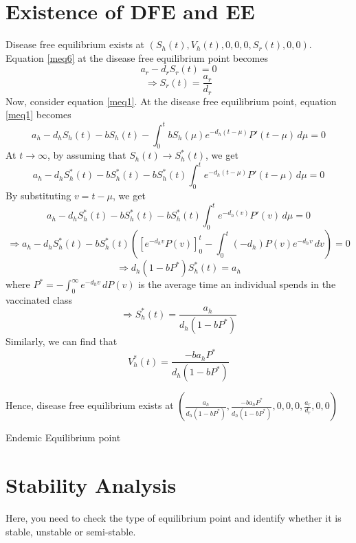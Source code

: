 \section{Existence of DFE and EE}
Disease free equilibrium exists at $(S_{h}(t), V_{h}(t), 0, 0, 0, S_{r}(t), 0, 0)$. Equation \ref{meq6} at the disease free equilibrium point becomes
\[a_{r}-d_{r}S_{r}(t) = 0\]
\[\Rightarrow S_{r}(t) = \frac{a_{r}}{d_{r}}\]
Now, consider equation \ref{meq1}. At the disease free equilibrium point, equation \ref{meq1} becomes
\[a_{h}-d_{h}S_{h}(t)-bS_{h}(t)-\int_{0}^{t} bS_{h}(\mu)e^{-d_{h}(t-\mu)}P'(t-\mu) \,d\mu = 0\]
At $t \rightarrow \infty$, by assuming that $S_{h}(t) \rightarrow S^{*}_{h}(t)$, we get
\[a_{h}-d_{h}S^{*}_{h}(t)-bS^{*}_{h}(t)-bS^{*}_{h}(t)\int_{0}^{t}e^{-d_{h}(t-\mu)}P'(t-\mu) \,d\mu = 0\]
By substituting $v = t-\mu$, we get
\[a_{h}-d_{h}S^{*}_{h}(t)-bS^{*}_{h}(t)-bS^{*}_{h}(t)\int_{0}^{t}e^{-d_{h}(v)}P'(v) \,d\mu = 0\]
\[\Rightarrow a_{h}-d_{h}S^{*}_{h}(t)-bS^{*}_{h}(t)\left(\left[e^{-d_{h}v}P(v)\right]^{t}_{0}-\int_{0}^{t}(-d_{h})P(v)e^{-d_{h}v} \,dv\right) = 0\]
\[\Rightarrow d_{h}(1-bP^{*})S^{*}_{h}(t) = a_{h}\]
where $P^{*} = -\int_{0}^{\infty}e^{-d_{h}v} \,dP(v) $ is the average time an individual spends in the vaccinated class
\[\Rightarrow S^{*}_{h}(t) = \frac{a_{h}}{d_{h}(1-bP^{*})}\]
Similarly, we can find that
\[V^{*}_{h}(t) = \frac{-ba_{h}P^{*}}{d_{h}(1-bP^{*})}\]

Hence, disease free equilibrium exists at $\left(\frac{a_{h}}{d_{h}(1-bP^{*})},\frac{-ba_{h}P^{*}}{d_{h}(1-bP^{*})},0,0,0,\frac{a_{r}}{d_{r}},0,0\right)$

Endemic Equilibrium point
\section{Stability Analysis}
Here, you need to check the type of equilibrium point and identify whether it is stable, unstable or semi-stable.